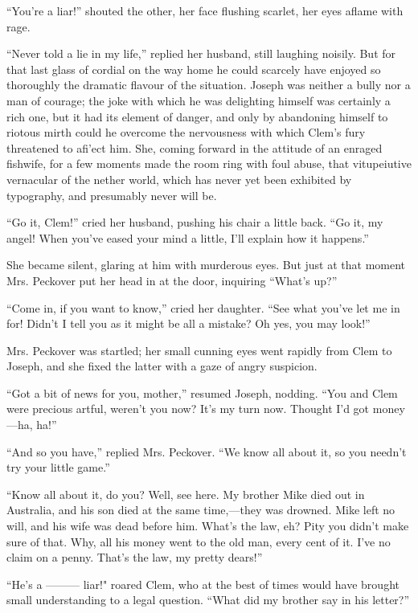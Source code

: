 ``You're a liar!'' shouted the other, her face flushing scarlet, her
eyes aflame with rage.

``Never told a lie in my life,'' replied her husband, still laughing
noisily. But for that last glass of cordial on the way home he could
scarcely have enjoyed so thoroughly the dramatic flavour of the
situation. Joseph was neither a bully nor a man of courage; the joke
with which he was delighting himself was certainly a rich one, but it
had its element of danger, and only by abandoning himself to riotous
mirth could he overcome the nervousness with which Clem's fury
threatened to afi'ect him. She, coming forward in the
{\protect\hypertarget{95}{}{}}attitude of an enraged fishwife, for a few
moments made the room ring with foul abuse, that vitupeiutive vernacular
of the nether world, which has never yet been exhibited by typography,
and presumably never will be.

``Go it, Clem!'' cried her husband, pushing his chair a little back.
``Go it, my angel! When you've eased your mind a little, I'll explain
how it happens.''

She became silent, glaring at him with murderous eyes. But just at that
moment Mrs. Peckover put her head in at the door, inquiring ``What's
up?''

``Come in, if you want to know,'' cried her daughter. ``See what you've
let me in for! Didn't I tell you as it might be all a mistake? Oh yes,
you may look!''

Mrs. Peckover was startled; her small cunning eyes went rapidly from
Clem to Joseph, and she fixed the latter with a gaze of angry suspicion.

``Got a bit of news for you, mother,'' resumed Joseph, nodding. ``You
and Clem were precious artful, weren't you now? It's
{\protect\hypertarget{96}{}{}}my turn now. Thought I'd got money---ha,
ha!''

``And so you have,'' replied Mrs. Peckover. ``We know all about it, so
you needn't try your little game.''

``Know all about it, do you? Well, see here. My brother Mike died out in
Australia, and his son died at the same time,---they was drowned. Mike
left no will, and his wife was dead before him. What's the law, eh? Pity
you didn't make sure of that. Why, all his money went to the old man,
every cent of it. I've no claim on a penny. That's the law, my pretty
dears!''

``He's a {{---------}} liar!" roared Clem, who at the best of times
would have brought small understanding to a legal question. ``What did
my brother say in his letter?''

